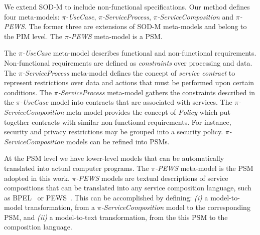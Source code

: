 We extend SOD-M to include non-functional specifications.
Our method defines four meta-models: \textit{$\pi$-UseCase}, \textit{$\pi$-ServiceProcess}, \textit{$\pi$-ServiceCom\-po\-si\-tion} and \textit{$\pi$-PEWS}.
The former three are extensions of SOD-M meta-models and belong to the PIM level.
The \textit{$\pi$-PEWS} meta-model is a PSM.

The \textit{$\pi$-UseCase} meta-model describes functional and non-functional requirements.
Non-functional requirements are defined as \textit{constraints} over processing and data.
The \textit{$\pi$-ServiceProcess} meta-model defines the concept of \textit{service contract} to represent restrictions over data and actions that must be performed upon certain conditions.
The \textit{$\pi$-ServiceProcess} meta-model gathers the constraints
described in the \textit{$\pi$-UseCase} model into contracts that are associated
with services.
The \textit{$\pi$-ServiceComposition} meta-model provides the concept of \textit{Policy}
which put together contracts with similar non-functional requirements.
For instance, security and privacy restrictions may be grouped into a security policy.
\textit{$\pi$-ServiceComposition} models can be refined into PSMs.

At the PSM level we have lower-level models that can be automatically translated into actual computer programs.
The \textit{$\pi$-PEWS} meta-model is the PSM adopted in this work.
\textit{$\pi$-PEWS} models are textual descriptions of service compositions that can be translated into any service composition language, such as BPEL~\cite{bpel03} or PEWS~\cite{BaCAM05,Placido2010LTPD}.
This can be accomplished by defining: \textit{(i)} a model-to-model transformation, from a \textit{$\pi$-ServiceComposition} model to the corresponding PSM, and \textit{(ii)} a model-to-text transformation, from the this PSM to the composition language.
